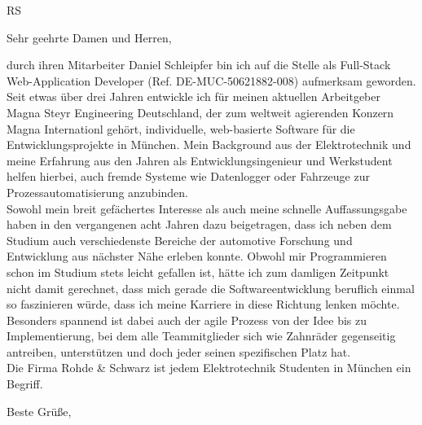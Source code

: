 \documentclass[
	pagenumber=false, %
	parskip=half, %
	fromalign=right, %
	foldmarks=true, %
	addrfield=true %
	]{scrlttr2}
\date{\today} %
\begin{document}
 
\begin{letter}{
RS
} %


\opening{Sehr geehrte Damen und Herren,}

durch ihren Mitarbeiter Daniel Schleipfer bin ich auf die Stelle als Full-Stack Web-Application Developer (Ref. DE-MUC-50621882-008) aufmerksam geworden.\\
Seit etwas über drei Jahren entwickle ich für meinen aktuellen Arbeitgeber Magna Steyr Engineering Deutschland, der zum weltweit agierenden Konzern Magna Internationl gehört, individuelle, web-basierte Software für die Entwicklungsprojekte in München. Mein Background aus der Elektrotechnik und meine Erfahrung aus den Jahren als Entwicklungsingenieur und Werkstudent helfen hierbei, auch fremde Systeme wie Datenlogger oder Fahrzeuge zur Prozessautomatisierung anzubinden.\\
Sowohl mein breit gefächertes Interesse als auch meine schnelle Auffassungsgabe haben in den vergangenen acht Jahren dazu beigetragen, dass ich neben dem Studium auch verschiedenste Bereiche der automotive Forschung und Entwicklung aus nächster Nähe erleben konnte. Obwohl mir Programmieren schon im Studium stets leicht gefallen ist, hätte ich zum damligen Zeitpunkt nicht damit gerechnet, dass mich gerade die Softwareentwicklung beruflich einmal so faszinieren würde, dass ich meine Karriere in diese Richtung lenken möchte. Besonders spannend ist dabei auch der agile Prozess von der Idee bis zu Implementierung, bei dem alle Teammitglieder sich wie Zahnräder gegenseitig antreiben, unterstützen und doch jeder seinen spezifischen Platz hat.\\
Die Firma Rohde \& Schwarz ist jedem Elektrotechnik Studenten in München ein Begriff. 

\closing{Beste Grüße,}



\end{letter}
 
\end{document}
